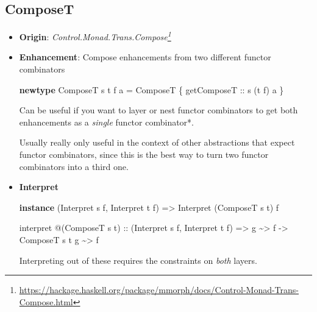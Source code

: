 \documentclass[]{article}
\newenvironment{Shaded}{}{}
\newcommand{\DataTypeTok}[1]{\textcolor[rgb]{0.56,0.13,0.00}{#1}}
\newcommand{\KeywordTok}[1]{\textcolor[rgb]{0.00,0.44,0.13}{\textbf{#1}}}
\newcommand{\NormalTok}[1]{#1}
\newcommand{\OperatorTok}[1]{\textcolor[rgb]{0.40,0.40,0.40}{#1}}
\newcommand{\OtherTok}[1]{\textcolor[rgb]{0.00,0.44,0.13}{#1}}
\renewcommand{\href}[2]{#2\footnote{\url{#1}}}
\begin{document}
\hypertarget{composet}{%
\subsection{ComposeT}\label{composet}}

\begin{itemize}
\item
  \textbf{Origin}:
  \emph{\href{https://hackage.haskell.org/package/mmorph/docs/Control-Monad-Trans-Compose.html}{Control.Monad.Trans.Compose}}
\item
  \textbf{Enhancement}: Compose enhancements from two different functor
  combinators

\begin{Shaded}
\begin{Highlighting}[]
\KeywordTok{newtype} \DataTypeTok{ComposeT}\NormalTok{ s t f a }\OtherTok{=} \DataTypeTok{ComposeT}\NormalTok{ \{}\OtherTok{ getComposeT ::}\NormalTok{ s (t f) a \}}
\end{Highlighting}
\end{Shaded}

  Can be useful if you want to layer or nest functor combinators to get both
  enhancements as a \emph{single} functor combinator*.

  Usually really only useful in the context of other abstractions that expect
  functor combinators, since this is the best way to turn two functor
  combinators into a third one.
\item
  \textbf{Interpret}

\begin{Shaded}
\begin{Highlighting}[]
\KeywordTok{instance}\NormalTok{ (}\DataTypeTok{Interpret}\NormalTok{ s f, }\DataTypeTok{Interpret}\NormalTok{ t f) }\OtherTok{=>} \DataTypeTok{Interpret}\NormalTok{ (}\DataTypeTok{ComposeT}\NormalTok{ s t) f}

\NormalTok{interpret }\OperatorTok{@}\NormalTok{(}\DataTypeTok{ComposeT}\NormalTok{ s t)}
\OtherTok{    ::}\NormalTok{ (}\DataTypeTok{Interpret}\NormalTok{ s f, }\DataTypeTok{Interpret}\NormalTok{ t f)}
    \OtherTok{=>}\NormalTok{ g }\OperatorTok{\textasciitilde{}>}\NormalTok{ f}
    \OtherTok{{-}>} \DataTypeTok{ComposeT}\NormalTok{ s t g }\OperatorTok{\textasciitilde{}>}\NormalTok{ f}
\end{Highlighting}
\end{Shaded}

  Interpreting out of these requires the constraints on \emph{both} layers.
\end{itemize}
\end{document}
